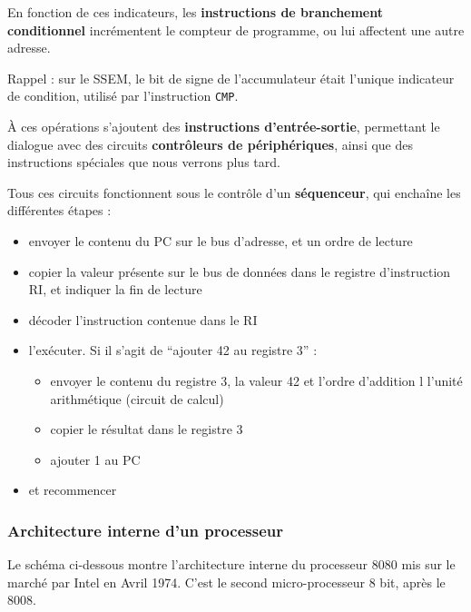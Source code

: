 \begin{multicols}{2}
En fonction de ces indicateurs, les \textbf{instructions de branchement 
conditionnel} incrémentent le compteur de programme, ou lui affectent 
une autre adresse.

Rappel : sur le SSEM, le bit de signe de l'accumulateur était l'unique
indicateur de condition, utilisé par l'instruction \texttt{CMP}.

À ces opérations s'ajoutent des \textbf{instructions d'entrée-sortie},
permettant le dialogue avec des circuits \textbf{contrôleurs de
  périphériques}, ainsi que des instructions spéciales que nous
verrons plus tard.


Tous ces circuits fonctionnent sous le contrôle d'un \textbf{séquenceur},
qui enchaîne les différentes étapes :
\begin{itemize}
\item envoyer le contenu du PC sur le bus d'adresse, et un ordre de lecture
\item copier la valeur présente sur le bus de données dans le registre
  d'instruction RI, et indiquer la fin de lecture
\item décoder l'instruction contenue dans le RI
\item l'exécuter. Si il s'agit de ``ajouter 42 au registre 3'' :
\begin{itemize}
\item envoyer le contenu du registre 3, la valeur 42 et l'ordre d'addition
l l'unité arithmétique (circuit de calcul)
\item copier le résultat dans le registre 3
\item ajouter 1 au PC
\end{itemize}
\item et recommencer
\end{itemize}

\end{multicols}
\subsubsection{Architecture interne d'un processeur}

Le schéma ci-dessous montre l'architecture interne du processeur 8080
mis sur le marché par Intel en Avril 1974. C'est le second
micro-processeur 8 bit, après le 8008.

